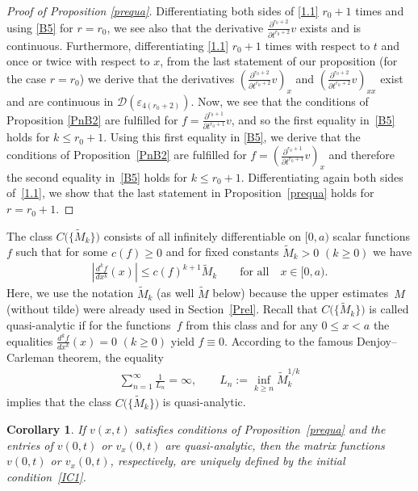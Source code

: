 \documentclass[pdftex]{sigma}
\newtheorem{Corollary}[Theorem]{Corollary}
\def\ve{\varepsilon}
\def\wt{\widetilde}
\def\p{\partial}
\newcommand{\cD}{{\mathcal D}}
\numberwithin{equation}{section}
\begin{document}
\begin{proof}[Proof of Proposition \ref{prequa}]
 Dif\/ferentiating both sides of \eqref{1.1} $r_0+1$ times and using \eqref{B5} for $r= r_0$, we see also that the derivative
 $\frac{\p^{r_0+2}}{\p t^{r_0+2}}v$ exists and is continuous. Furthermore, dif\/ferentiating \eqref{1.1} $r_0+1$ times with respect to $t$
 and once or twice with respect to $x$, from the last statement of our proposition (for the case $r=r_0$) we derive that the derivatives
 $\left(\frac{\p^{r_0+2}}{\p t^{r_0+2}}v\right)_{x}$ and $\left(\frac{\p^{r_0+2}}{\p t^{r_0+2}}v\right)_{xx}$ exist and are continuous
 in $\cD(\ve_{4(r_0+2)})$. Now, we see that the conditions of Proposition \ref{PnB2}
are fulf\/illed for $f=\frac{\p^{r_0+1}}{\p t^{r_0+1}}v$, and so the f\/irst equality in~\eqref{B5} holds for $k\leq r_0+1$.
Using this f\/irst equality in \eqref{B5}, we derive that the conditions of Proposition~\ref{PnB2}
are fulf\/illed for $f=\left(\frac{\p^{r_0+1}}{\p t^{r_0+1}}v\right)_x$
and therefore the second equality in~\eqref{B5} holds for $k\leq r_0+1$.
Dif\/ferentiating again both sides of~\eqref{1.1}, we show that the last statement in Proposition~\ref{prequa} holds for $r =r_0+1$.
\end{proof}

The class $C\big(\{\wt M_k\}\big)$
consists of all inf\/initely dif\/ferentiable on $[0, a)$ scalar functions $f$ such that for some
$c(f) \geq 0$ and for f\/ixed constants $\wt M_k >0 $ $(k \geq 0)$ we have
\begin{gather*} %
\left| \frac{d^k f}{dx^k}(x)\right|\leq c(f)^{k+1}\wt M_k \qquad \text{for all} \quad x\in [0, a).
\end{gather*}
Here, we use the notation $\wt M_k$ (as well $\wt M$ below) because the upper estimates~$M$ (without tilde) were already used
in Section~\ref{Prel}.
Recall that $C\big(\{\wt M_k\}\big)$ is called quasi-analytic if
for the func\-tions~$f$ from this class and for any $0\leq x <a$ the equalities $\frac{d^k f}{dx^k}(x)=0$ $(k\geq 0)$ yield $f\equiv 0$.
According to the famous Denjoy--Carleman theorem, the equality
\begin{gather*} %
\sum_{n=1}^{\infty}\frac{1}{L_n}=\infty, \qquad L_n:=\inf_{k\geq n}\wt M_k^{1/k}
\end{gather*}
implies that the class $C\big(\{\wt M_k\}\big)$ is quasi-analytic.
\begin{Corollary}\label{CyRec} If $v(x,t)$ satisfies conditions of Proposition~{\rm \ref{prequa}} and the entries of $v(0,t)$
or $v_x(0,t)$ are quasi-analytic, then the matrix functions $v(0,t)$ or $v_x(0,t)$, respectively, are uniquely defined
by the initial condition~\eqref{IC1}.
\end{Corollary}
\end{document}
